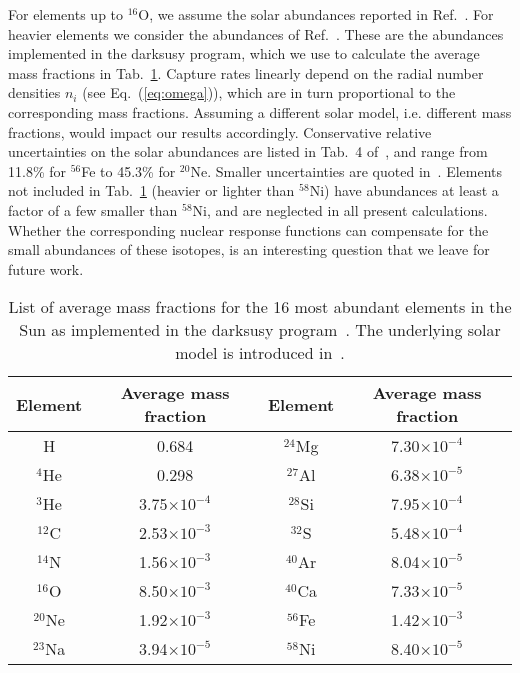 \documentclass[11pt,a4paper]{article}
\begin{document}
For elements up to $^{16}$O, we assume the solar abundances reported in Ref.~\cite{Bahcall:2004pz}. For heavier elements we consider the abundances of Ref.~\cite{Grevesse:1998bj}. These are the abundances implemented in the {\sffamily darksusy} program, which we use to calculate the average mass fractions in Tab.~\ref{tab:massfrac}. Capture rates linearly depend on the radial number densities $n_i$ (see Eq.~(\ref{eq:omega})), which are in turn proportional to the corresponding mass fractions. Assuming a different solar model, i.e. different mass fractions, would impact our results accordingly. Conservative relative uncertainties on the solar abundances are listed in Tab.~4 of~\cite{Serenelli:2012zw}, and range from 11.8\% for $^{56}$Fe to 45.3\% for $^{20}$Ne. Smaller uncertainties are quoted in~\cite{Asplund:2009fu}. Elements not included in Tab.~\ref{tab:massfrac} (heavier or lighter than $^{58}$Ni) have abundances at least a factor of a few smaller than $^{58}$Ni, and are neglected in all present calculations. Whether the corresponding nuclear response functions can compensate for the small abundances of these isotopes, is an interesting question that we leave for future work.
\begin{table}
  \centering
  \begin{tabular}[!h]{|c|c|c|c|}
\hline
    Element& Average mass fraction &  Element& Average mass fraction\\
\hline
\hline
H& 0.684&${}^{24}$Mg&7.30$\times10^{-4}$\\   
\hline
${}^{4}$He& 0.298 &${}^{27}$Al&6.38$\times10^{-5}$\\  
\hline
${}^3$He& 3.75$\times10^{-4}$ &${}^{28}$Si&7.95$\times10^{-4}$\\
\hline
${}^{12}$C& 2.53$\times10^{-3}$&${}^{32}$S&5.48$\times10^{-4}$ \\
\hline
${}^{14}$N& 1.56$\times10^{-3}$&${}^{40}$Ar&8.04$\times10^{-5}$\\ 
\hline
${}^{16}$O&8.50$\times10^{-3}$&${}^{40}$Ca&7.33$\times10^{-5}$\\
\hline
${}^{20}$Ne&1.92$\times10^{-3}$&${}^{56}$Fe&1.42$\times10^{-3}$\\
\hline
${}^{23}$Na&3.94$\times10^{-5}$&${}^{58}$Ni&8.40$\times10^{-5}$\\
\hline
  \end{tabular}
  \caption{List of average mass fractions for the 16 most abundant elements in the Sun as implemented in the {\sffamily darksusy} program~\cite{Gondolo:2004sc}. The underlying solar model is introduced in~\cite{Bahcall:2004pz}.}
\label{tab:massfrac}
\end{table}
\end{document}
